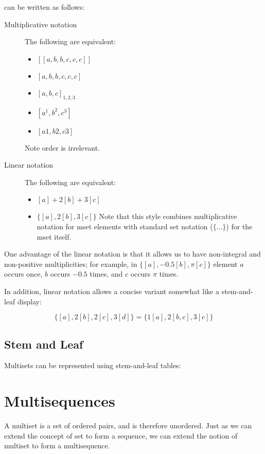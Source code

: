 \documentclass[reqno,12pt]{tufte-book}
\numberwithin{equation}{subsection}
\begin{document}
\noindent can be written as follows:

\begin{description}
\item [Multiplicative notation]  The following are equivalent:

\begin{itemize}
\item $[[a,b,b,c,c,c]]$
\item $[a,b,b,c,c,c]$
\item $[a,b,c]_{1,2,3}$
\item $[a^1,b^2,c^3]$
\item $[a1,b2,c3]$
\end{itemize}

Note order is irrelevant.

\item [Linear notation]  The following are equivalent:

\begin{itemize}
\item $[a]+2[b]+3[c]$
\item $\{[a],2[b],3[c]\}$ Note that this style combines multiplicative
  notation for mset elements with standard set notation ($\{\ldots\}$)
  for the mset itself.
\end{itemize}
\end{description}

One advantage of the linear notation is that it allows us to have
non-integral and non-positive multiplicities; for example, in
$\{[a],-0.5[b],\pi[c]\}$ element $a$ occurs once, $b$ occurs $-0.5$
times, and $c$ occurs $\pi$ times.

In addition, linear notation allows a concise variant somewhat like a
stem-and-leaf display:

$$\{[a],2[b],2[c],3[d]\} = \{1[a], 2[b,c], 3[c]\}$$

\subsection{Stem and Leaf}

Multisets can be represented using stem-and-leaf tables:

\section{Multisequences}

A multiset is a set of ordered pairs, and is therefore unordered.
Just as we can extend the concept of set to form a sequence, we can
extend the notion of multiset to form a multisequence.
\end{document}
